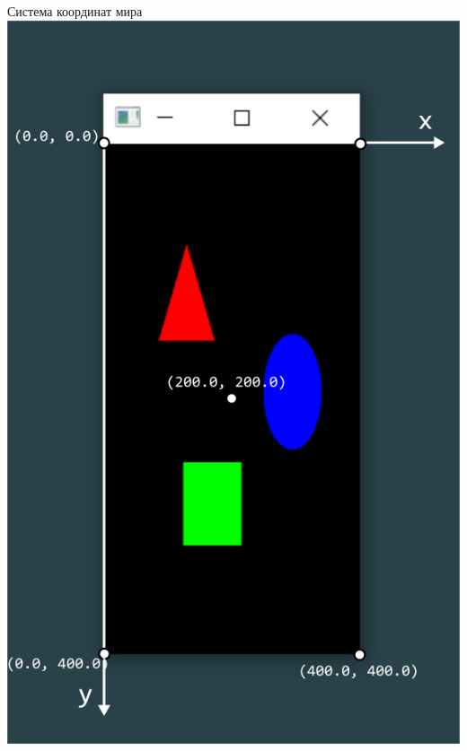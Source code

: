 \documentclass{article}
\begin{document}
\begin{minipage}{0.5\textwidth}
\begin{center}
Система координат мира
\includegraphics[scale=1]{../images/system_coords_narrow.png}
\end{center}
\end{minipage}
\vspace{0.5cm}
\end{document}
